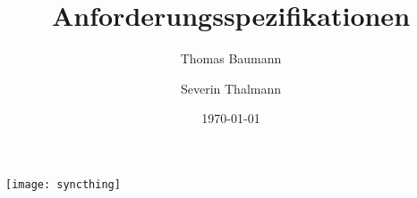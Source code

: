 \makeatletter
    \begin{titlepage}
        \begin{center}
            \texttt{[image: syncthing]}\\[4ex]
            {\huge \bfseries  \@title }\\[2ex] 
            {\LARGE  \@author}\\[50ex] 
            {\large \@date}
        \end{center}
    \end{titlepage}
\makeatother
\thispagestyle{empty}
\newpage

\subject{Projekt 1 - UPD Vorgänge}
\title{Anforderungsspezifikationen}
\author{
Thomas Baumann
\and
Severin Thalmann
}
\date{\today}
\maketitle

